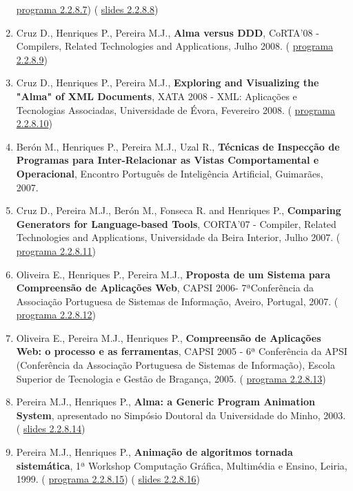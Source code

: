\documentclass[11pt]{article}
\begin{document}
\begin{enumerate}
{\href{run:ComunicacoesOrais/programas/CoRTA08prog.pdf}{programa 2.2.8.7}) (
\href{run:ComunicacoesOrais/Corta08VLapres.pdf}{slides 2.2.8.8})}
\item{Cruz D., Henriques P., Pereira M.J., {
\bf{ Alma versus DDD}}, CoRTA'08 - Compilers, Related Technologies and Applications, Julho 2008. (
\href{run:ComunicacoesOrais/programas/CoRTA08prog.pdf}{programa 2.2.8.9})}
\item{Cruz D., Henriques P., Pereira M.J., {
\bf{ Exploring and Visualizing the "Alma" of XML Documents}}, XATA 2008 - XML: Aplicações e Tecnologias Associadas, Universidade de Évora, Fevereiro 2008. (
\href{run:ComunicacoesOrais/programas/XATA2008.pdf}{programa 2.2.8.10})}
\item{Berón M., Henriques P., Pereira M.J., Uzal R., {
\bf{ Técnicas de Inspecção de Programas para Inter-Relacionar as Vistas Comportamental e Operacional}}, Encontro Português de Inteligência Artificial, Guimarães, 2007.}
\item{Cruz D., Pereira M.J., Berón M., Fonseca R. and Henriques P., {
\bf{ Comparing Generators for Language-based Tools}}, CORTA'07 - Compiler, Related Technologies and Applications, Universidade da Beira Interior, Julho 2007. (
\href{run:ComunicacoesOrais/programas/CoRTA2007prog.pdf}{programa 2.2.8.11})}
\item{Oliveira E., Henriques P., Pereira M.J., {
\bf{ Proposta de um Sistema para Compreensão de Aplicações Web}}, CAPSI 2006- 7ªConferência da Associação Portuguesa de Sistemas de Informação, Aveiro, Portugal, 2007. (
\href{run:ComunicacoesOrais/programas/CAPSI2006.pdf}{programa 2.2.8.12})}
\item{Oliveira E., Pereira M.J., Henriques P., {
\bf{ Compreensão de Aplicações Web: o processo e as ferramentas}}, CAPSI 2005 - 6ª Conferência da APSI (Conferência da Associação Portuguesa de Sistemas de Informação), Escola Superior de Tecnologia e Gestão de Bragança, 2005. (
\href{run:ComunicacoesOrais/programas/CAPSI2005.pdf}{programa 2.2.8.13})}
\item{Pereira M.J., Henriques P., {
\bf{ Alma: a Generic Program Animation System}}, apresentado no Simpósio Doutoral da Universidade do Minho, 2003.  (
\href{run:ComunicacoesOrais/SimDoutoralapres.pdf}{slides 2.2.8.14})}
\item{Pereira M.J., Henriques P., {
\bf{ Animação de algoritmos tornada sistemática}}, 1ª Workshop Computação Gráfica, Multimédia e Ensino, Leiria, 1999. (
\href{run:ComunicacoesOrais/programas/CGME1999.pdf}{programa 2.2.8.15}) (
\href{run:ComunicacoesOrais/cgme99apres.pdf}{slides 2.2.8.16})}
\end{enumerate}
\end{document}
